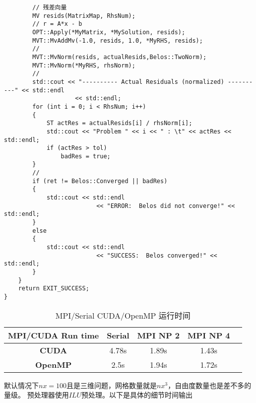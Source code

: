 \begin{lstlisting}
        // 残差向量
        MV resids(MatrixMap, RhsNum);
        // r = A*x - b
        OPT::Apply(*MyMatrix, *MySolution, resids);
        MVT::MvAddMv(-1.0, resids, 1.0, *MyRHS, resids);
        // 
        MVT::MvNorm(resids, actualResids,Belos::TwoNorm);
        MVT::MvNorm(*MyRHS, rhsNorm);
        // 
        std::cout << "---------- Actual Residuals (normalized) ----------" << std::endl
                    << std::endl;
        for (int i = 0; i < RhsNum; i++)
        {
            ST actRes = actualResids[i] / rhsNorm[i];
            std::cout << "Problem " << i << " : \t" << actRes << std::endl;
            if (actRes > tol)
                badRes = true;
        }
        // 
        if (ret != Belos::Converged || badRes)
        {
            std::cout << std::endl
                          << "ERROR:  Belos did not converge!" << std::endl;
        }
        else
        {
            std::cout << std::endl
                          << "SUCCESS:  Belos converged!" << std::endl;
        }
    }
    return EXIT_SUCCESS;
}
\end{lstlisting}

\newpage
\begin{table}[htbp]
\setlength{\tabcolsep}{8mm}
\begin{tabular}{ccccc}
\hline
\multicolumn{1}{|c|}{\textbf{MPI/CUDA Run time}} & \multicolumn{1}{c|}{\textbf{Serial}} & \multicolumn{1}{c|}{\textbf{MPI NP 2}} & \multicolumn{1}{c|}{\textbf{MPI NP 4}} \\ \hline
\multicolumn{1}{|c|}{\textbf{CUDA}} & \multicolumn{1}{c|}{4.78s} & \multicolumn{1}{c|}{1.89s} & \multicolumn{1}{c|}{1.43s} \\ \hline
\multicolumn{1}{|c|}{\textbf{OpenMP}} & \multicolumn{1}{c|}{2.5s} & \multicolumn{1}{c|}{1.94s} & \multicolumn{1}{c|}{1.72s} \\ \hline
\end{tabular}
\caption{MPI/Serial CUDA/OpenMP 运行时间}
\end{table}
默认情况下$nx=100$且是三维问题，网格数量就是$nx^3$，自由度数量也是差不多的量级。
预处理器使用$ILU$预处理。以下是具体的细节时间输出

